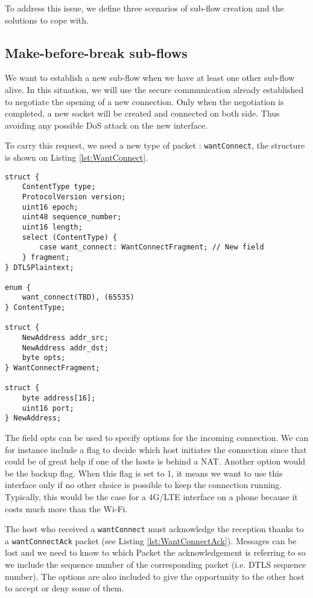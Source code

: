 To address this issue, we define three scenarios of sub-flow creation and the solutions to cope with.

\subsection{Make-before-break sub-flows}

We want to establish a new sub-flow when we have at least one other sub-flow alive. In this situation, we will use the secure communication already established to negotiate the opening of a new connection. Only when the negotiation is completed, a new socket will be created and connected on both side. Thus avoiding any possible DoS attack on the new interface.

To carry this request, we need a new type of packet : \texttt{wantConnect}, the structure is shown on Listing \ref{lst:WantConnect}.

\begin{lstlisting}[caption= WantConnect message structure, label=lst:WantConnect]
struct {
    ContentType type;
    ProtocolVersion version;
    uint16 epoch;
    uint48 sequence_number;
    uint16 length;
    select (ContentType) {
        case want_connect: WantConnectFragment; // New field
    } fragment;
} DTLSPlaintext;

enum {
    want_connect(TBD), (65535)
} ContentType;

struct {
    NewAddress addr_src;
    NewAddress addr_dst;
    byte opts;
} WantConnectFragment;

struct {
    byte address[16];
    uint16 port;
} NewAddress;
\end{lstlisting}

The field opts can be used to specify options for the incoming connection.  We can for instance include a flag to decide which host initiates the connection since that could be of great help if one of the hosts is behind a NAT. Another option would be the backup flag. When this flag is set to 1, it means we want to use this interface only if no other choice is possible to keep the connection running. Typically, this would be the case for a 4G/LTE interface on a phone because it costs much more than the Wi-Fi.

The host who received a \texttt{wantConnect} must acknowledge the reception thanks to a \texttt{wantConnectAck} packet (see Listing \ref{lst:WantConnectAck}). Messages can be lost and we need to know to which Packet the acknowledgement is referring to so we include the sequence number of the corresponding packet (i.e. DTLS sequence number). The options are also included to give the opportunity to the other host to accept or deny some of them.

